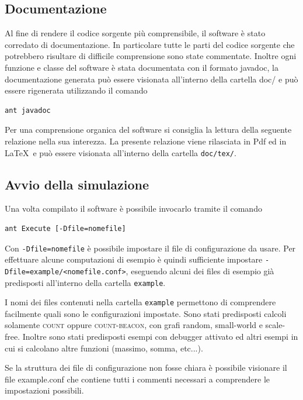 \documentclass[a4paper,12pt]{article}
\begin{document}
\subsection{Documentazione}

Al fine di rendere il codice sorgente pi\`u comprensibile, il software \`e stato corredato di documentazione. In particolare tutte le parti del codice sorgente che potrebbero risultare di difficile comprensione sono state commentate. Inoltre ogni funzione e classe del software \`e stata documentata con il formato \textsf {javadoc}, la documentazione generata pu\`o essere visionata all'interno della cartella \textsf{doc/} e pu\`o essere rigenerata utilizzando il comando
\begin{lstlisting}[basicstyle=\ttfamily]
ant javadoc
\end{lstlisting}

Per una comprensione organica del software si consiglia la lettura della seguente relazione nella sua interezza. La presente relazione viene rilasciata in Pdf ed in \LaTeX\ e pu\`o essere visionata all'interno della cartella \texttt{doc/tex/}.

\subsection{Avvio della simulazione}

Una volta compilato il software \`e possibile invocarlo tramite il comando
\begin{lstlisting}[basicstyle=\ttfamily]
ant Execute [-Dfile=nomefile]
\end{lstlisting}

Con \texttt{-Dfile=nomefile} \`e possibile impostare il file di configurazione da usare. Per effettuare alcune computazioni di esempio \`e quindi sufficiente impostare \texttt{-Dfile=example/<nomefile.conf>}, eseguendo alcuni dei files di esempio gi\`a predisposti all'interno della cartella \texttt{example}.

I nomi dei files contenuti nella cartella \texttt{example} permettono di comprendere facilmente quali sono le configurazioni impostate. Sono stati predisposti calcoli solamente \textsc{count} oppure \textsc{count-beacon}, con grafi random, small-world e scale-free. Inoltre sono stati predisposti esempi con debugger attivato ed altri esempi in cui si calcolano altre funzioni (massimo, somma, etc...).

Se la struttura dei file di configurazione non fosse chiara \`e possibile visionare il file \textsf{example.conf} che contiene tutti i commenti necessari a comprendere le impostazioni possibili.
\end{document}
